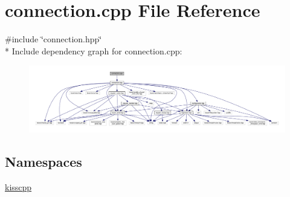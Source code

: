 \hypertarget{a00055}{\section{connection.\-cpp File Reference}
\label{a00055}
}
{\ttfamily \#include \char`\"{}connection.\-hpp\char`\"{}}\\*
Include dependency graph for connection.\-cpp\-:\nopagebreak
\begin{figure}[H]
\begin{center}
\leavevmode
\includegraphics[width=350pt]{a00101}
\end{center}
\end{figure}
\subsection*{Namespaces}
\begin{DoxyCompactItemize}
\item 
\hyperlink{a00089}{kisscpp}
\end{DoxyCompactItemize}
